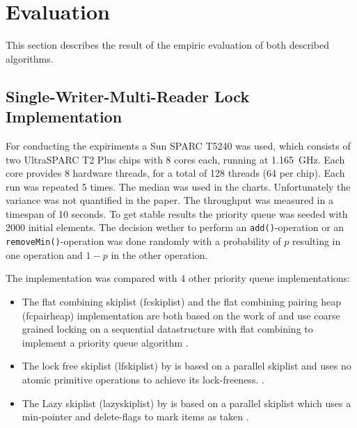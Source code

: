 
\section{Evaluation}

This section describes the result of the empiric evaluation of both described algorithms.

\subsection{Single-Writer-Multi-Reader Lock Implementation}

For conducting the expiriments a Sun SPARC T5240 was used, which consists of two UltraSPARC T2 Plus chips with 8 cores each, running at 1.165~GHz. Each core provides 8 hardware threads, for a total of 128 threads (64 per chip). Each run was repeated 5 times. The median was used in the charts. Unfortunately the variance was not quantified in the paper. The throughput was measured in a timespan of 10 seconds. To get stable results the priority queue was seeded with 2000 initial elements. The decision wether to perform an \texttt{add()}-operation or an \texttt{removeMin()}-operation was done randomly with a probability of $p$ resulting in one operation and $1-p$ in the other operation.

The implementation was compared with 4 other priority queue implementations:
\begin{itemize}
	\item The flat combining skiplist (fcskiplist) and the flat combining pairing heap (fcpairheap) implementation are both based on the work of \citeauthor{hendler_flat_2010} and use coarse grained locking on a sequential datastructure with flat combining to implement a priority queue algorithm \cite{hendler_flat_2010}.
	\item The lock free skiplist (lfskiplist) by \citeauthor{sundell_fast_2003} is based on a parallel skiplist and uses no atomic primitive operations to achieve its lock-freeness. \cite{sundell_fast_2003}.
	\item The Lazy skiplist (lazyskiplist) by \citeauthor{lotan_skiplist-based_2000} is based on a parallel skiplist which uses a min-pointer and delete-flags to mark items as taken \cite{lotan_skiplist-based_2000}.
\end{itemize}




